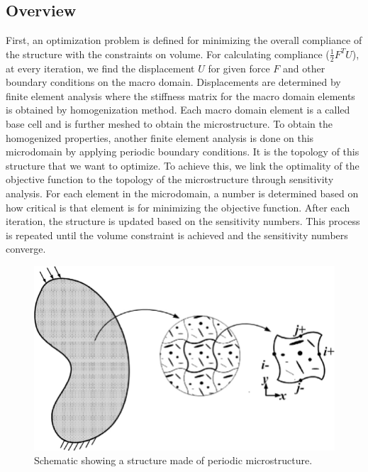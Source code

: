 \documentclass[10pt]{article}
\begin{document}
\subsection{Overview}
First, an optimization problem is defined for minimizing the overall compliance of the structure with the constraints on volume. For calculating compliance ($\frac{1}{2}F^TU$), at every iteration, we find the displacement $U$ for given force $F$ and other boundary conditions on the macro domain. Displacements are determined by finite element analysis where the stiffness matrix for the macro domain elements is obtained by homogenization method. Each macro domain element is a called base cell and is further meshed to obtain the microstructure. To obtain the homogenized properties, another finite element analysis is done on this microdomain by applying periodic boundary conditions. It is the topology of this structure that we want to optimize. To achieve this, we link the optimality of the objective function to the topology of the microstructure through sensitivity analysis. For each element in the microdomain, a number is determined based on how critical is that element is for minimizing the objective function. After each iteration, the structure is updated based on the sensitivity numbers. This process is repeated until the volume constraint is achieved and the sensitivity numbers converge.
\begin{figure}[H]
\begin{center}
\includegraphics[scale=0.28]{./Plots/opti/microstructure.png}
\caption{Schematic showing a structure made of periodic microstructure.}
\label{fig:cantilever}
\end{center}
\end{figure}
\end{document}
